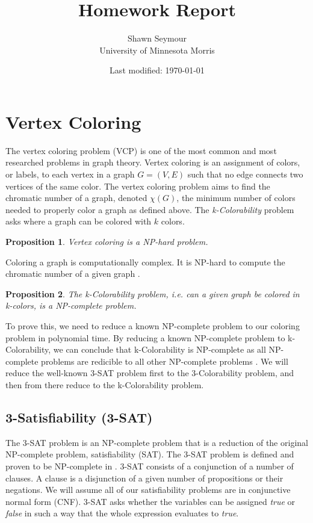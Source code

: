 \documentclass{article}
\title{Homework Report}
\date{Last modified: \today}
\author{Shawn Seymour\\ University of Minnesota Morris}
\newtheorem{prop}{Proposition}
\theoremstyle{definition}
\begin{document}
\maketitle

\section*{Vertex Coloring}
The vertex coloring problem (VCP) is one of the most common and most researched problems in graph theory. Vertex coloring is an assignment of colors, or labels, to each vertex in a graph \(G = (V, E)\) such that no edge connects two vertices of the same color. The vertex coloring problem aims to find the chromatic number of a graph, denoted \(\chi(G)\), the minimum number of colors needed to properly color a graph as defined above. The \emph{k-Colorability} problem asks where a graph can be colored with \(k\) colors.

\begin{prop}
Vertex coloring is a NP-hard problem.
\end{prop}

Coloring a graph is computationally complex. It is NP-hard to compute the chromatic number of a given graph \cite{garey}.

\begin{prop}
The k-Colorability problem, i.e. can a given graph be colored in k-colors, is a NP-complete problem.
\end{prop}

To prove this, we need to reduce a known NP-complete problem to our coloring problem in polynomial time. By reducing a known NP-complete problem to k-Colorability, we can conclude that k-Colorability is NP-complete as all NP-complete problems are redicible to all other NP-complete problems \cite{gareynp}. We will reduce the well-known 3-SAT problem first to the 3-Colorability problem, and then from there reduce to the k-Colorability problem.

\subsection*{3-Satisfiability (3-SAT)}
The 3-SAT problem is an NP-complete problem that is a reduction of the original NP-complete problem, satisfiability (SAT). The 3-SAT problem is defined and proven to be NP-complete in \cite{gareynp}. 3-SAT consists of a conjunction of a number of clauses. A clause is a disjunction of a given number of propositions or their negations. We will assume all of our satisfiability problems are in conjunctive normal form (CNF). 3-SAT asks whether the variables can be assigned \emph{true} or \emph{false} in such a way that the whole expression evaluates to \emph{true}.
\end{document}
